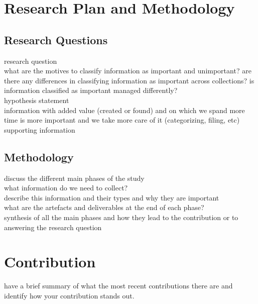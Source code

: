 \documentclass{article}
\begin{document}
\section{Research Plan and Methodology}
\subsection{Research Questions}
research question\\
what are the motives to classify information as important and unimportant? are there any differences in classifying information as important across collections? is information classified as important managed differently? \\
hypothesis statement\\
information with added value (created or found) and on which we spand more time is more important and we take more care of it (categorizing, filing, etc)\\
supporting information\\
\subsection{Methodology}
discuss the different main phases of the study\\
what information do we need to collect?\\
describe this information and their types and why they are important\\
what are the artefacts and deliverables at the end of each phase?\\
synthesis of all the main phases and how they lead to the contribution or to answering the research question\\
\section{Contribution}
have a brief summary of what the most recent contributions there are and identify how your contribution stands out. 


\end{document}
